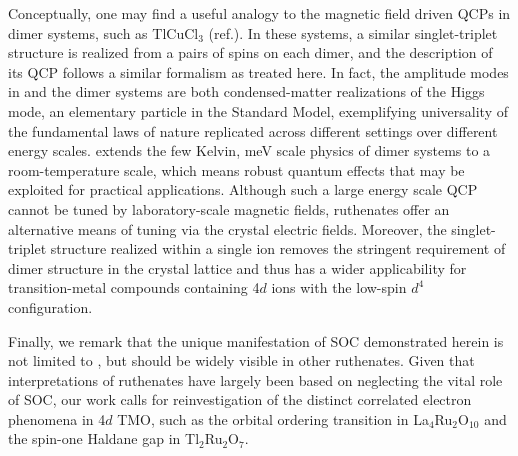 Conceptually, one may find a useful analogy to the magnetic field driven QCPs in dimer systems, such as TlCuCl$_3$ (ref.\cite{R_egg_2003}). In these systems, a similar singlet-triplet structure is realized from a pairs of spins on each dimer, and the description of its QCP follows a similar formalism as treated here. In fact, the amplitude modes in \CRO and the dimer systems are both condensed-matter realizations of the Higgs mode\cite{Aad20121}, an elementary particle in the Standard Model, exemplifying universality of the fundamental laws of nature replicated across different settings over different energy scales. \CRO extends the few Kelvin, meV scale physics of dimer systems to a room-temperature scale, which means robust quantum effects that may be exploited for practical applications. Although such a large energy scale QCP cannot be tuned by laboratory-scale magnetic fields, ruthenates offer an alternative means of tuning via the crystal electric fields. Moreover, the singlet-triplet structure realized within a single ion removes the stringent requirement of dimer structure in the crystal lattice and thus has a wider applicability for transition-metal compounds containing 4$d$ ions with the low-spin $d^4$ configuration.
  
Finally, we remark that the unique manifestation of SOC demonstrated herein is not limited to \CROns, but should be widely visible in other ruthenates. Given that interpretations of ruthenates have largely been based on neglecting the vital role of SOC, our work calls for reinvestigation of the distinct correlated electron phenomena in 4$d$ TMO, such as the orbital ordering transition in La$_4$Ru$_2$O$_{10}$ and the spin-one Haldane gap in Tl$_2$Ru$_2$O$_7$.
  
  
  
  
  
  
  
  